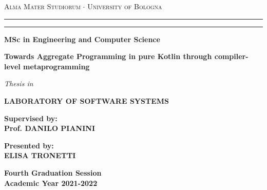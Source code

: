 \begin{titlepage}
    \begin{center}
    {{\Large{
        \textsc{Alma Mater Studiorum $\cdot$ University of Bologna}
    }}}
    \rule[0.1cm]{15.8cm}{0.1mm}
    \rule[0.5cm]{15.8cm}{0.6mm}
    {\small{\bf MSc in Engineering and Computer Science}}
    \vspace{41mm} %
    \end{center}
    \begin{center}
        \huge\bf Towards Aggregate Programming in pure Kotlin through compiler-level metaprogramming
    \end{center}
    \vspace{41mm} %
    \begin{center}
    {{\emph{Thesis in}}}
    
    \vspace{1mm}
    {{\bf{LABORATORY OF SOFTWARE SYSTEMS}}}
    \vspace{18mm}
    \end{center}
    \par
    \noindent
    \begin{minipage}[t]{0.47\textwidth}
    {\large{\bf Supervised by:\\
    Prof. DANILO PIANINI}}
    \end{minipage}
    \hfill
    \begin{minipage}[t]{0.47\textwidth}\raggedleft
    {\large{\bf Presented by:\\
    ELISA TRONETTI}}
    \end{minipage}
    \vspace{20mm}
    \begin{center}
    {\large{\bf Fourth Graduation Session\\
    Academic Year 2021-2022}}
    \end{center}
\end{titlepage}
